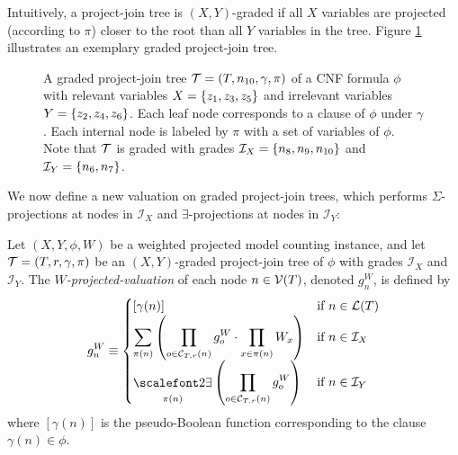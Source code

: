 Intuitively, a project-join tree is $(X,Y)$-graded if all $X$ variables are projected (according to $\pi$) closer to the root than all $Y$ variables in the tree. Figure \ref{tree_ex} illustrates an exemplary graded project-join tree.
\begin{figure}[t]
    \centering
    \caption{
        A graded project-join tree $\mathcal{T} = (T, n_{10}, \gamma, \pi)$ of a CNF formula $\phi$ with relevant variables $X = \left\{ z_1, z_3, z_5 \right\}$ and irrelevant variables $Y = \left\{ z_2, z_4, z_6 \right\}$.
        Each leaf node corresponds to a clause of $\phi$ under $\gamma$.
        Each internal node is labeled by $\pi$ with a set of variables of $\phi$.
        Note that $\mathcal{T}$ is graded with grades $\mathcal{I}_X = \left\{ n_8, n_9, n_{10} \right\}$ and $\mathcal{I}_Y = \left\{ n_6, n_7 \right\}$.
    }
    \label{tree_ex}
\end{figure}

We now define a new valuation on graded project-join trees, which performs $\Sigma$-projections at nodes in $\mathcal{I}_X$ and $\exists$-projections at nodes in $\mathcal{I}_Y$:
\begin{definition}
    \label{def:graded_valuation}
    Let $(X, Y, \phi, W)$ be a weighted projected model counting instance, and let $\mathcal{T} = (T, r, \gamma, \pi)$ be an $(X,Y)$-graded project-join tree of $\phi$ with grades $\mathcal{I}_X$ and $\mathcal{I}_Y$.
    The \emph{$W$-projected-valuation} of each node $n \in \mathcal{V}(T)$, denoted $g^W_n$, is defined by
    \begin{align*}
        g^W_n \equiv
        \begin{cases}
            [\gamma(n)] & \text{if } n \in \Lv{T} \\
            \displaystyle\sum_{\pi(n)} \pars{ \prod_{o \in \C T r n} g^W_o \cdot \prod_{x \in \pi(n)} W_x } & \text{if } n \in \mathcal{I}_X \\
            \displaystyle\exist_{\pi(n)} \pars{ \prod_{o \in \C T r n} g^W_o } & \text{if } n \in \mathcal{I}_Y
        \end{cases}
    \end{align*}
    where $[\gamma(n)]$ is the pseudo-Boolean function corresponding to the clause $\gamma(n) \in \phi$.
\end{definition}

